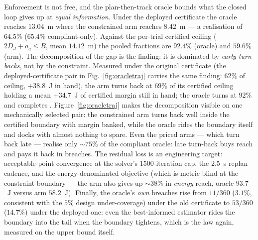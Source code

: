 \documentclass[preprint,12pt]{elsarticle}
\begin{document}
Enforcement is not free, and the plan-then-track oracle bounds what
the closed loop gives up at \emph{equal information}. Under the
deployed certificate the oracle reaches $13.04$~m where the
constrained arm reaches $8.42$~m --- a realisation of $64.5\%$
($65.4\%$ compliant-only).
 Against the per-trial certified ceiling ($2D_J + a_q \le B$,
mean $14.12$~m) the pooled fractions are $92.4\%$ (oracle) and
$59.6\%$ (arm).
 The decomposition of the gap is the finding: it is dominated by
\emph{early turn-backs}, not by the constraint. Measured under the
original certificate (the deployed-certificate pair in
Fig.~\ref{fig:oracletraj} carries the same finding: $62\%$ of
ceiling, $+38.8$~J in hand), the arm turns back at
$69\%$ of its certified ceiling holding a mean $+34.7$~J of certified
margin still in hand; the oracle turns at $92\%$ and completes
. Figure~\ref{fig:oracletraj} makes the decomposition visible on one
mechanically selected pair: the constrained arm turns back well inside
the certified boundary with margin banked, while the oracle rides the
boundary itself and docks with almost nothing to spare.
Even the priced arms --- which turn back late --- realise only
${\sim}75\%$ of the compliant oracle: late turn-back buys reach and
pays it back in breaches. The residual loss is an engineering
target: acceptable-point convergence at the solver's 1500-iteration
cap, the 2.5~s replan cadence, and the energy-denominated objective
(which is metric-blind at the constraint boundary --- the arm also
gives up ${\sim}38\%$ in \emph{energy} reach, oracle $93.7$~J versus
arm $58.2$~J).
 Finally, the oracle's \emph{own} breaches rise from $11/360$
($3.1\%$, consistent with the $5\%$ design under-coverage) under the
old certificate to $53/360$ ($14.7\%$) under the deployed one:
 even the best-informed estimator rides the boundary into the tail
when the boundary tightens, which is the law again, measured on the
upper bound itself.
\end{document}
